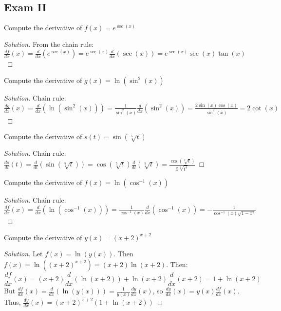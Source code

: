 \documentclass[crop=false,class=book,oneside]{standalone}
\begin{document}
        \subsection{Exam II}
            \begin{problem}
            Compute the derivative of $f(x)=e^{\sec(x)}$
            \end{problem}
            \begin{proof}[Solution]
            From the chain rule: $\frac{df}{dx}(x)=\frac{d}{dx}(e^{\sec(x)})=e^{\sec(x)}\frac{d}{dx}(\sec(x))=e^{\sec(x)}\sec(x)\tan(x)$
            \end{proof}
            \begin{problem}
            Compute the derivative of $g(x)=\ln(\sin^{2}(x))$
            \end{problem}
            \begin{proof}[Solution]
            Chain rule: $\frac{dg}{dx}(x)=\frac{d}{dx}(\ln(\sin^{2}(x)))=\frac{1}{\sin^{2}(x)}\frac{d}{dx}(\sin^{2}(x))=\frac{2\sin(x)\cos(x)}{\sin^{2}(x)}=2\cot(x)$
            \end{proof}
            \begin{problem}
            Compute the derivative of $s(t)=\sin(\sqrt[5]{t})$
            \end{problem}
            \begin{proof}[Solution]
            Chain rule: $\frac{ds}{dt}(t)=\frac{d}{dt}(\sin(\sqrt[5]{t}))=\cos(\sqrt[5]{t})\frac{d}{dt}(\sqrt[5]{t})=\frac{\cos(\sqrt[5]{t})}{5\sqrt[5]{t^{4}}}$
            \end{proof}
            \begin{problem}
            Compute the derivative of $f(x)=\ln(\cos^{-1}(x))$
            \end{problem}
            \begin{proof}[Solution]
            Chain rule: $\frac{df}{dx}(x)=\frac{d}{dx}(\ln(\cos^{-1}(x)))=\frac{1}{\cos^{-1}(x)}\frac{d}{dx}(\cos^{-1}(x))=-\frac{1}{\cos^{-1}(x)\sqrt{1-x^{2}}}$
            \end{proof}
            \begin{problem}
            Compute the derivative of $y(x)=(x+2)^{x+2}$
            \end{problem}
            \begin{proof}[Solution]
            Let $f(x)=\ln(y(x))$. Then $f(x)=\ln((x+2)^{x+2})=(x+2)\ln(x+2)$. Then:
            \begin{equation*}
                \frac{df}{dx}(x)=(x+2)\frac{d}{dx}(\ln(x+2))+\ln(x+2)\frac{d}{dx}(x+2)=1+\ln(x+2)
            \end{equation*}
            But $\frac{df}{dx}(x)=\frac{d}{dx}(\ln(y(x)))=\frac{1}{y(x)}\frac{dy}{dx}(x)$, so $\frac{dy}{dx}(x)=y(x)\frac{df}{dx}(x)$. Thus, $\frac{dy}{dx}(x)=(x+2)^{x+2}(1+\ln(x+2))$
            \end{proof}
\end{document}
